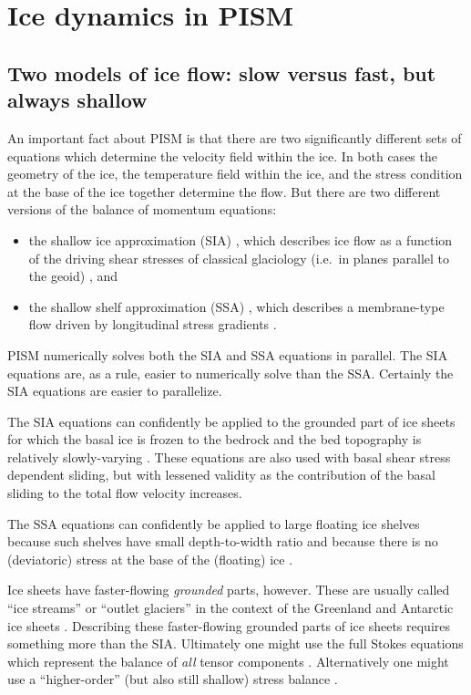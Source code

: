 \documentclass[11pt,final]{amsart}
\begin{document}
\clearpage
\newpage
\section{Ice dynamics in PISM}\label{sect:dynamics}

\subsection{Two models of ice flow: slow versus fast, but always shallow}  An important fact about PISM is that there are two significantly different sets of equations which determine the velocity field within the ice.  In both cases the geometry of the ice, the temperature field within the ice, and the stress condition at the base of the ice together determine the flow.  But there are two different versions of the balance of momentum equations:\begin{itemize}
\item the shallow ice approximation (SIA) \cite{Hutter}, which describes ice flow as a function of the driving shear stresses of classical glaciology (i.e.~in planes parallel to the geoid) \cite{Paterson}, and
\item the shallow shelf approximation (SSA) \cite{WeisGreveHutter}, which describes a membrane-type flow driven by longitudinal stress gradients \cite{Morland,MacAyeal,SchoofStream}.
\end{itemize}

PISM numerically solves both the SIA and SSA equations in parallel.  The SIA equations are, as a rule, easier to numerically solve than the SSA.  Certainly the SIA equations are easier to parallelize.

The SIA equations can confidently be applied to the grounded part of ice sheets for which the basal ice is frozen to the bedrock and the bed topography is relatively slowly-varying \cite{Fowler}.  These equations are also used with basal shear stress dependent sliding, but with lessened validity as the contribution of the basal sliding to the total flow velocity increases.

The SSA equations can confidently be applied to large floating ice shelves because such shelves have small depth-to-width ratio and because there is no (deviatoric) stress at the base of the (floating) ice \cite{Morland,MorlandZainuddin}.

Ice sheets have faster-flowing \emph{grounded} parts, however.  These are usually called ``ice streams'' or ``outlet glaciers'' in the context of the Greenland and Antarctic ice sheets \cite{BamberVaughanJoughin}.  Describing these faster-flowing grounded parts of ice sheets requires something more than the SIA.  Ultimately one might use the full Stokes equations which represent the balance of \emph{all} tensor components \cite{Fowler}.  Alternatively one might use a ``higher-order'' (but also still shallow) stress balance \cite{Blatter}.
\end{document}
